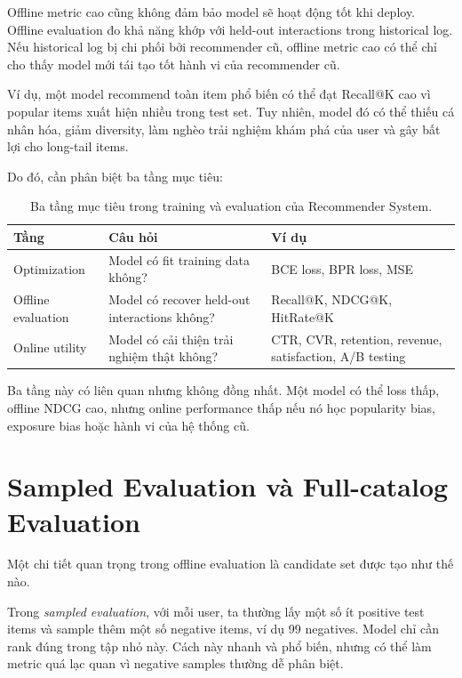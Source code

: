 \documentclass[12pt,a4paper]{article}
\begin{document}
Offline metric cao cũng không đảm bảo model sẽ hoạt động tốt khi deploy. Offline evaluation đo khả năng khớp với held-out interactions trong historical log. Nếu historical log bị chi phối bởi recommender cũ, offline metric cao có thể chỉ cho thấy model mới tái tạo tốt hành vi của recommender cũ.

Ví dụ, một model recommend toàn item phổ biến có thể đạt Recall@K cao vì popular items xuất hiện nhiều trong test set. Tuy nhiên, model đó có thể thiếu cá nhân hóa, giảm diversity, làm nghèo trải nghiệm khám phá của user và gây bất lợi cho long-tail items.

Do đó, cần phân biệt ba tầng mục tiêu:

\begin{table}[h!]
\centering
\small
\begin{tabular}{p{3.2cm} p{4.5cm} p{5.5cm}}
\toprule
\textbf{Tầng} & \textbf{Câu hỏi} & \textbf{Ví dụ} \\
\midrule
Optimization & Model có fit training data không? & BCE loss, BPR loss, MSE \\
Offline evaluation & Model có recover held-out interactions không? & Recall@K, NDCG@K, HitRate@K \\
Online utility & Model có cải thiện trải nghiệm thật không? & CTR, CVR, retention, revenue, satisfaction, A/B testing \\
\bottomrule
\end{tabular}
\caption{Ba tầng mục tiêu trong training và evaluation của Recommender System.}
\label{tab:three_layers}
\end{table}

Ba tầng này có liên quan nhưng không đồng nhất. Một model có thể loss thấp, offline NDCG cao, nhưng online performance thấp nếu nó học popularity bias, exposure bias hoặc hành vi của hệ thống cũ.

\section{Sampled Evaluation và Full-catalog Evaluation}

Một chi tiết quan trọng trong offline evaluation là candidate set được tạo như thế nào.

Trong \textit{sampled evaluation}, với mỗi user, ta thường lấy một số ít positive test items và sample thêm một số negative items, ví dụ 99 negatives. Model chỉ cần rank đúng trong tập nhỏ này. Cách này nhanh và phổ biến, nhưng có thể làm metric quá lạc quan vì negative samples thường dễ phân biệt.
\end{document}
